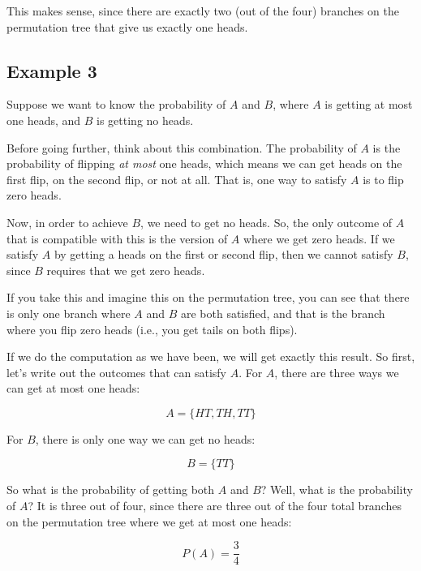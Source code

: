 \documentclass[../../../main.tex]{subfiles}
\begin{document}
\noindent
This makes sense, since there are exactly two (out of the four) branches on the permutation tree that give us exactly one heads.


\subsection{Example 3}

Suppose we want to know the probability of $A$ and $B$, where $A$ is getting at most one heads, and $B$ is getting no heads. 

Before going further, think about this combination. The probability of $A$ is the probability of flipping \emph{at most} one heads, which means we can get heads on the first flip, on the second flip, or not at all. That is, one way to satisfy $A$ is to flip zero heads.

Now, in order to achieve $B$, we need to get no heads. So, the only outcome of $A$ that is compatible with this is the version of $A$ where we get zero heads. If we satisfy $A$ by getting a heads on the first or second flip, then we cannot satisfy $B$, since $B$ requires that we get zero heads. 

If you take this and imagine this on the permutation tree, you can see that there is only one branch where $A$ and $B$ are both satisfied, and that is the branch where you flip zero heads (i.e., you get tails on both flips). 

If we do the computation as we have been, we will get exactly this result. So first, let's write out the outcomes that can satisfy $A$. For $A$, there are three ways we can get at most one heads:

\begin{equation*}
  A = \{ HT, TH, TT \}
\end{equation*}

\noindent
For $B$, there is only one way we can get no heads:

\begin{equation*}
  B = \{ TT \}
\end{equation*}

\noindent
So what is the probability of getting both $A$ and $B$? Well, what is the probability of $A$? It is three out of four, since there are three out of the four total branches on the permutation tree where we get at most one heads:

\begin{equation*}
  P(A) = \frac{3}{4}
\end{equation*}
\end{document}
